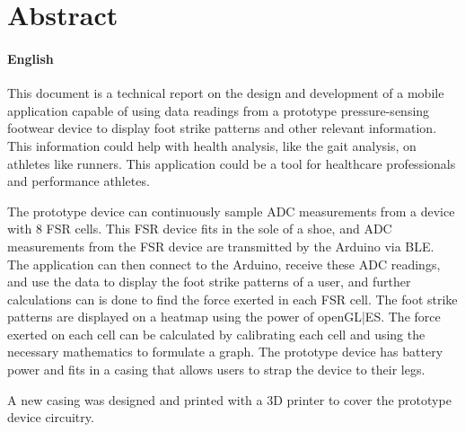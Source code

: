 \chapter*{Abstract}
\makeatletter{}\makeatother

\subsubsection*{English}

This document is a technical report on the design and development of a mobile application capable of using data readings from a prototype pressure-sensing footwear device to display foot strike patterns and other relevant information. This information could help with health analysis, like the gait analysis, on athletes like runners. This application could be a tool for healthcare professionals and performance athletes.

The prototype device can continuously sample ADC measurements from a device with 8 FSR cells. This FSR device fits in the sole of a shoe, and ADC measurements from the FSR device are transmitted by the Arduino via BLE. The application can then connect to the Arduino, receive these ADC readings, and use the data to display the foot strike patterns of a user, and further calculations can is done to find the force exerted in each FSR cell. The foot strike patterns are displayed on a heatmap using the power of openGL|ES. The force exerted on each cell can be calculated by calibrating each cell and using the necessary mathematics to formulate a graph. The prototype device has battery power and fits in a casing that allows users to strap the device to their legs.

A new casing was designed and printed with a 3D printer to cover the prototype device circuitry.



